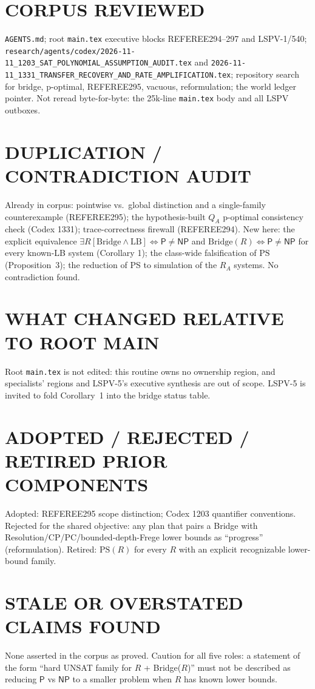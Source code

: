 \documentclass[11pt]{article}
\newcommand{\Pc}{\mathsf P}
\newcommand{\NP}{\mathsf{NP}}
\begin{document}
\section*{CORPUS REVIEWED}
\texttt{AGENTS.md}; root \texttt{main.tex} executive blocks REFEREE294--297 and LSPV-1/540;
\texttt{research/agents/codex/2026-11-11\_1203\_SAT\_POLYNOMIAL\_ASSUMPTION\_AUDIT.tex}
and \texttt{2026-11-11\_1331\_TRANSFER\_RECOVERY\_AND\_RATE\_AMPLIFICATION.tex};
repository search for bridge, p-optimal, REFEREE295, vacuous, reformulation; the world ledger pointer.
Not reread byte-for-byte: the 25k-line \texttt{main.tex} body and all LSPV outboxes.

\section*{DUPLICATION / CONTRADICTION AUDIT}
Already in corpus: pointwise vs.\ global distinction and a single-family counterexample (REFEREE295);
the hypothesis-built $Q_A$ p-optimal consistency check (Codex 1331); trace-correctness firewall (REFEREE294).
New here: the explicit equivalence $\exists R[\mathrm{Bridge}\wedge\mathrm{LB}]\iff\Pc\ne\NP$ and
$\mathrm{Bridge}(R)\iff\Pc\neq\NP$ for every known-LB system (Corollary 1); the class-wide falsification of
$\mathrm{PS}$ (Proposition~3); the reduction of PS to simulation of the $R_A$ systems. No contradiction found.

\section*{WHAT CHANGED RELATIVE TO ROOT MAIN}
Root \texttt{main.tex} is not edited: this routine owns no ownership region, and specialists' regions and
LSPV-5's executive synthesis are out of scope. LSPV-5 is invited to fold Corollary~1 into the bridge status table.

\section*{ADOPTED / REJECTED / RETIRED PRIOR COMPONENTS}
Adopted: REFEREE295 scope distinction; Codex 1203 quantifier conventions. Rejected for the shared objective:
any plan that pairs a Bridge with Resolution/CP/PC/bounded-depth-Frege lower bounds as ``progress''
(reformulation). Retired: $\mathrm{PS}(R)$ for every $R$ with an explicit recognizable lower-bound family.

\section*{STALE OR OVERSTATED CLAIMS FOUND}
None asserted in the corpus as proved. Caution for all five roles: a statement of the form ``hard UNSAT family
for $R$ + Bridge($R$)'' must not be described as reducing $\Pc$ vs $\NP$ to a smaller problem when $R$ has known lower bounds.
\end{document}
